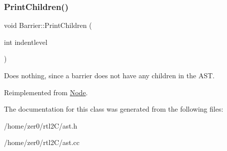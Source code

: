 \subsubsection{\texorpdfstring{Print\+Children()}{PrintChildren()}}
{\footnotesize\ttfamily void Barrier\+::\+Print\+Children (\begin{DoxyParamCaption}\item[{int}]{indentlevel }\end{DoxyParamCaption})\hspace{0.3cm}{\ttfamily [virtual]}}

Does nothing, since a barrier does not have any children in the A\+ST. 

Reimplemented from \hyperlink{class_node_a3e67ec8d22182b721717af14fe0c3000}{Node}.



The documentation for this class was generated from the following files\+:\begin{DoxyCompactItemize}
\item 
/home/zer0/rtl2\+C/ast.\+h\item 
/home/zer0/rtl2\+C/ast.\+cc\end{DoxyCompactItemize}
